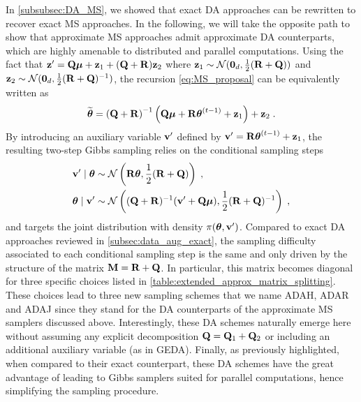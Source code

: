 \documentclass[nohypdvips,onefignum,onetabnum]{siamart171218}
\begin{document}
In \cref{subsubsec:DA_MS}, we showed that exact DA approaches can be rewritten to recover exact MS approaches. In the following, we will take the opposite path to show that approximate MS approaches admit approximate DA counterparts, which are highly amenable to distributed and parallel computations.
Using the fact that $\mathbf{z}' = \mathbf{Q}\boldsymbol{\mu} + \mathbf{z}_1 + (\mathbf{Q} + \mathbf{R})\mathbf{z}_2$ where $\mathbf{z}_1 \sim \mathcal{N}(\mathbf{0}_d, \frac{1}{2}(\mathbf{R} + \mathbf{Q}))$ and $\mathbf{z}_2 \sim \mathcal{N}(\mathbf{0}_d, \frac{1}{2}(\mathbf{R} + \mathbf{Q})^{-1})$, the recursion \eqref{eq:MS_proposal} can be equivalently written as
$$
\widetilde{\boldsymbol{\theta}} = \left(\mathbf{Q}+\mathbf{R}\right)^{-1}\left(\mathbf{Q}\boldsymbol{\mu} + \mathbf{R}\boldsymbol{\theta}^{(t-1)} + \mathbf{z}_1\right) + \mathbf{z}_2\;. 
$$
By introducing an auxiliary variable $\mathbf{v}'$ defined by $\mathbf{v}' = \mathbf{R}\boldsymbol{\theta}^{(t-1)} + \mathbf{z}_1$, the resulting two-step Gibbs sampling relies on the conditional sampling steps
\begin{align*}
  \mathbf{v}'\mid\boldsymbol{\theta} &\sim \mathcal{N}\left(\mathbf{R}\boldsymbol{\theta},\frac{1}{2}(\mathbf{R} + \mathbf{Q})\right)\;,\\
  \boldsymbol{\theta}\mid\mathbf{v}' &\sim \mathcal{N}\left((\mathbf{Q} + \mathbf{R})^{-1}(\mathbf{v}'+\mathbf{Q}\boldsymbol{\mu}),\frac{1}{2}(\mathbf{R} + \mathbf{Q})^{-1}\right)\;,
\end{align*}
and targets the joint distribution with density $\pi(\boldsymbol{\theta},\mathbf{v}')$. 
Compared to exact DA approaches reviewed in \cref{subsec:data_aug_exact}, the sampling difficulty associated to each conditional sampling step is the same and only driven by the structure of the matrix $\mathbf{M} = \mathbf{R} + \mathbf{Q}$. In particular, this matrix  becomes diagonal for three specific choices listed in \cref{table:extended_approx_matrix_splitting}. 
These choices lead to three new sampling schemes that we name ADAH, ADAR and ADAJ since they stand for the DA counterparts of the approximate MS samplers discussed above. Interestingly, these DA schemes naturally emerge here without assuming any explicit decomposition $\mathbf{Q} = \mathbf{Q}_1 + \mathbf{Q}_2$ or including an additional auxiliary variable (as in GEDA). Finally, as previously highlighted, when compared to their exact counterpart, these DA schemes have the great advantage of leading to Gibbs samplers suited for  parallel computations, hence simplifying the sampling procedure.
\end{document}
